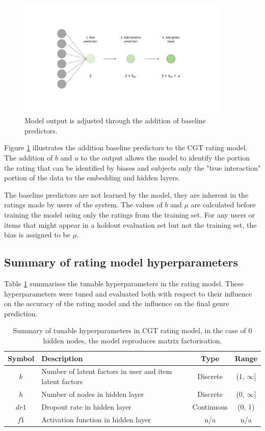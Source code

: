 \begin{figure}[H]
\centering
\includegraphics[width=0.9\textwidth]{Figures/4_CGT-output-layer.pdf}
\decoRule
\caption[Rating layer]{Model output is adjusted through the addition of baseline predictors.}
\label{fig:4_CGT-rating-layer}
\end{figure}

Figure \ref{fig:4_CGT-rating-layer} illustrates the addition baseline predictors to the CGT rating model. The addition of $b$ and $u$ to the output allows the model to identify the portion the rating that can be identified by biases and subjects only the "true interaction" portion of the data to the embedding and hidden layers.

The baseline predictors are not learned by the model, they are inherent in the ratings made by users of the system. The values of $b$ and $\mu$ are calculated before training the model using only the ratings from the training set. For any users or items that might appear in a holdout evaluation set but not the training set, the bias is assigned to be $\mu$.

\subsection{Summary of rating model hyperparameters}
Table \ref{tab:rating-hparams} summarises the tunable hyperparameters in the rating model. These hyperparameters were tuned and evaluated both with respect to their influence on the accuracy of the  rating model and the influence on the final genre prediction.
\begin{table}[H]
\centering
\begin{tabular}{c | p{3.5cm} | c | c}
\toprule
\textbf{Symbol} & \textbf{Description} & \textbf{Type} & \textbf{Range} \\
\midrule
$k$ & Number of latent factors in user and item latent factors & Discrete & (1, $\infty$] \\
\midrule
$h$ & Number of nodes in hidden layer & Discrete & (0, $\infty$] \\
\midrule
$dr1$ & Dropout rate in hidden layer & Continuous & (0, 1) \\
\midrule
$f1$ & Activation function in hidden layer & n/a & n/a \\
\bottomrule
\end{tabular}
\caption[Rating model hyperparameters]{Summary of tunable hyperparameters in CGT rating model, in the case of 0 hidden nodes, the model reproduces matrix factorisation.}
\label{tab:rating-hparams}
\end{table}

